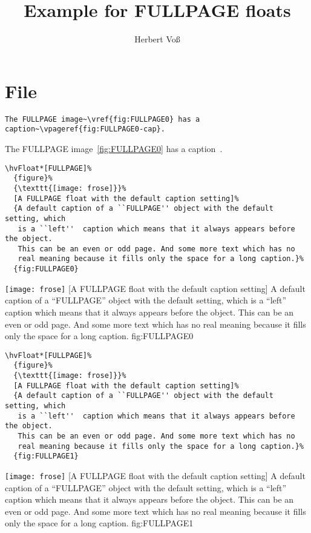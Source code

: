 \documentclass[twocolumn]{scrartcl}
\begin{document}
\title{Example for FULLPAGE floats}
\author{Herbert Voß}
\maketitle

\tableofcontents

\blinddocument

\section{File \texttt{\jobname}}

\begin{lstlisting}
The FULLPAGE image~\vref{fig:FULLPAGE0} has a caption~\vpageref{fig:FULLPAGE0-cap}.
\end{lstlisting}

The FULLPAGE image~\vref{fig:FULLPAGE0} has a caption~.

\begin{lstlisting}
\hvFloat*[FULLPAGE]%
  {figure}%
  {\texttt{[image: frose]}}%
  [A FULLPAGE float with the default caption setting]%
  {A default caption of a ``FULLPAGE'' object with the default setting, which
   is a ``left''  caption which means that it always appears before the object.
   This can be an even or odd page. And some more text which has no
   real meaning because it fills only the space for a long caption.}%
  {fig:FULLPAGE0}
\end{lstlisting}


\Float[default]
%
  {\texttt{[image: frose]}}%
  [A FULLPAGE float with the default caption setting]%
  {A default caption of a ``FULLPAGE'' object with the default setting, which
   is a ``left''  caption which means that it always appears before the object.
   This can be an even or odd page. And some more text which has no
   real meaning because it fills only the space for a long caption.}%
  {fig:FULLPAGE0}

\blinddocument

\begin{lstlisting}
\hvFloat*[FULLPAGE]%
  {figure}%
  {\texttt{[image: frose]}}%
  [A FULLPAGE float with the default caption setting]%
  {A default caption of a ``FULLPAGE'' object with the default setting, which
   is a ``left''  caption which means that it always appears before the object.
   This can be an even or odd page. And some more text which has no
   real meaning because it fills only the space for a long caption.}%
  {fig:FULLPAGE1}
\end{lstlisting}


\Float[default]
%
  {\texttt{[image: frose]}}%
  [A FULLPAGE float with the default caption setting]%
  {A default caption of a ``FULLPAGE'' object with the default setting, which
   is a ``left''  caption which means that it always appears before the object.
   This can be an even or odd page. And some more text which has no
   real meaning because it fills only the space for a long caption.}%
  {fig:FULLPAGE1}

\blinddocument

\Blindtext

\blindtext
\end{document}
